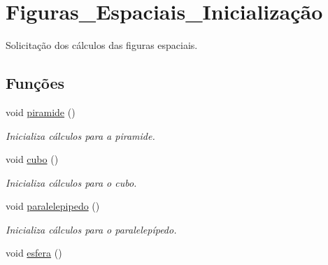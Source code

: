 \hypertarget{group__Figuras__Espaciais__Inicializa_xC3_xA7_xC3_xA3o}{}\section{Figuras\+\_\+\+Espaciais\+\_\+\+Inicialização}
\label{group__Figuras__Espaciais__Inicializa_xC3_xA7_xC3_xA3o}


Solicitação dos cálculos das figuras espaciais.  


\subsection*{Funções}
\begin{DoxyCompactItemize}
\item 
void \hyperlink{group__Figuras__Espaciais__Inicializa_xC3_xA7_xC3_xA3o_gae3945922f925bc3d1fd95c5dc4ff6987}{piramide} ()\hypertarget{group__Figuras__Espaciais__Inicializa_xC3_xA7_xC3_xA3o_gae3945922f925bc3d1fd95c5dc4ff6987}{}\label{group__Figuras__Espaciais__Inicializa_xC3_xA7_xC3_xA3o_gae3945922f925bc3d1fd95c5dc4ff6987}

\begin{DoxyCompactList}\small\item\em Inicializa cálculos para a piramide. \end{DoxyCompactList}\item 
void \hyperlink{group__Figuras__Espaciais__Inicializa_xC3_xA7_xC3_xA3o_gaf0b7d023166ce6902197d4082a66ad03}{cubo} ()\hypertarget{group__Figuras__Espaciais__Inicializa_xC3_xA7_xC3_xA3o_gaf0b7d023166ce6902197d4082a66ad03}{}\label{group__Figuras__Espaciais__Inicializa_xC3_xA7_xC3_xA3o_gaf0b7d023166ce6902197d4082a66ad03}

\begin{DoxyCompactList}\small\item\em Inicializa cálculos para o cubo. \end{DoxyCompactList}\item 
void \hyperlink{group__Figuras__Espaciais__Inicializa_xC3_xA7_xC3_xA3o_gaf5c3350f35c2d9ae97c0243b7aeac39e}{paralelepipedo} ()\hypertarget{group__Figuras__Espaciais__Inicializa_xC3_xA7_xC3_xA3o_gaf5c3350f35c2d9ae97c0243b7aeac39e}{}\label{group__Figuras__Espaciais__Inicializa_xC3_xA7_xC3_xA3o_gaf5c3350f35c2d9ae97c0243b7aeac39e}

\begin{DoxyCompactList}\small\item\em Inicializa cálculos para o paralelepípedo. \end{DoxyCompactList}\item 
void \hyperlink{group__Figuras__Espaciais__Inicializa_xC3_xA7_xC3_xA3o_ga947bf2f326598c591bbdbf77a0280266}{esfera} ()\hypertarget{group__Figuras__Espaciais__Inicializa_xC3_xA7_xC3_xA3o_ga947bf2f326598c591bbdbf77a0280266}{}\label{group__Figuras__Espaciais__Inicializa_xC3_xA7_xC3_xA3o_ga947bf2f326598c591bbdbf77a0280266}


\end{DoxyCompactItemize}
